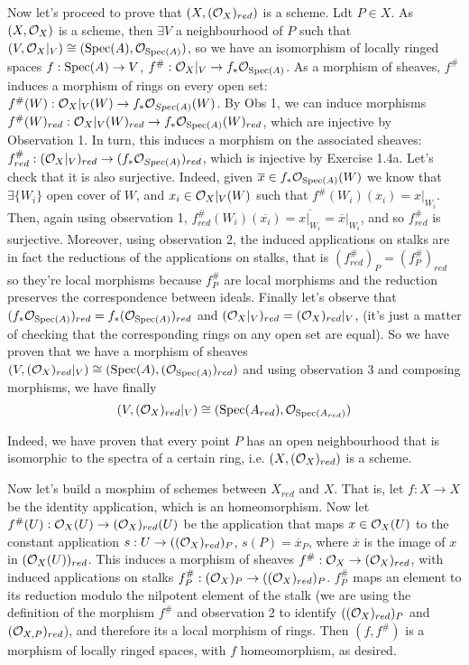 \begin{sol}
\begin{enumerate}[label=\alph*)]
		Now let's proceed to prove that $(X,(\mathcal{O}_X)_{red})$ is a scheme. Ldt $P \in X$. As $(X, \mathcal{O}_X)$ is a scheme, then $\exists V$ a neighbourhood of $P$ such that $(V, \mathcal{O}_X|_{V}) \cong (\mathrm{Spec}(A), \mathcal{O}_{\mathrm{Spec}(A)})$, so we have an isomorphism of locally ringed spaces $f: \mathrm{Spec}(A) \to V$, $f^{\#}: \mathcal{O}_X|_V \to f_* \mathcal{O}_{\mathrm{Spec}(A)}$. As a morphism of sheaves, $f^{\#}$ induces a morphism of rings on every open set: $f^{\#}(W): \mathcal{O}_X|_V (W) \to f_* \mathcal{O}_{Spec(A)}(W)$. By Obs 1, we can induce morphisms $f^{\#}(W)_{red}: \mathcal{O}_X|_V (W)_{red} \to f_* \mathcal{O}_{\mathrm{Spec}(A)}(W)_{red}$, which are injective by Observation 1. In turn, this induces a morphism on the associated sheaves: $f^{\#}_{red}: (\mathcal{O}_X|_V)_{red} \to (f_* \mathcal{O}_{Spec(A)})_{red}$, which is injective by Exercise 1.4a. Let's check that it is also surjective. Indeed, given $\overline{x} \in f_* \mathcal{O}_{\mathrm{Spec}(A)}(W)$ we know that $\exists \{W_i\}$ open cover of $W$, and $x_i \in \mathcal{O}_X|_V (W)$ such that $f^{\#}(W_i)(x_i) = x|_{W_i}$. Then, again using observation 1, $f^{\#}_{red}(W_i)(\overline{x_i}) = \overline{x|_{W_i}} = \overline{x}|_{W_i}$, and so $f^{\#}_{red}$ is surjective. Moreover, using observation 2, the induced applications on stalks are in fact the reductions of the applications on stalks, that is $(f^{\#}_{red})_P = (f^{\#}_P)_{red}$ so they're local morphisms because $f^{\#}_P$ are local morphisms and the reduction preserves the correspondence between ideals. Finally let's observe that $(f_* \mathcal{O}_{\mathrm{Spec}(A)})_{red} = f_*(\mathcal{O}_{\mathrm{Spec}(A)})_{red}$ and $(\mathcal{O}_X|_V)_{red} = (\mathcal{O}_X)_{red}|_{V}$, (it's just a matter of checking that the corresponding rings on any open set are equal). So we have proven that we have a morphism of sheaves $(V,(\mathcal{O}_X)_{red}|_V) \cong (\mathrm{Spec}(A), (\mathcal{O}_{\mathrm{Spec}(A)})_{red})$ and using observation 3 and composing morphisms, we have finally 
		\[
			(V,(\mathcal{O}_X)_{red}|_V) \cong (\mathrm{Spec}(A_{red}), \mathcal{O}_{\mathrm{Spec}(A_{red})})
		\]

		Indeed, we have proven that every point $P$ has an open neighbourhood that is isomorphic to the spectra of a certain ring, i.e. $(X, (\mathcal{O}_X)_{red})$ is a scheme.

		Now let's build a mosphim of schemes between $X_{red}$ and $X$. That is, let $f: X \to X$ be the identity application, which is an homeomorphism. Now let $f^{\#}(U): \mathcal{O}_X(U) \to (\mathcal{O}_X)_{red}(U)$ be the application that maps $x \in \mathcal{O}_X(U)$ to the constant application $s: U \to ((\mathcal{O}_X)_{red})_P$, $s(P) = \overline{x}_P$, where $\overline{x}$ is the image of $x$ in $(\mathcal{O}_X(U))_{red}$. This induces a morphism of sheaves $f^{\#}: \mathcal{O}_X \to (\mathcal{O}_X)_{red}$, with induced applications on stalks $f^{\#}_P: (\mathcal{O}_X)_P \to ((\mathcal{O}_X)_{red})_P$. $f^{\#}_P$ maps an element to its reduction modulo the nilpotent element of the stalk (we are using the definition of the morphism $f^{\#}$ and observation 2 to identify $((\mathcal{O}_X)_{red})_P$ and $(\mathcal{O}_{X,P})_{red}$), and therefore its a local morphism of rings. Then $(f,f^{\#})$ is a morphism of locally ringed spaces, with $f$ homeomorphism, as desired.


\end{enumerate}
\end{sol}
